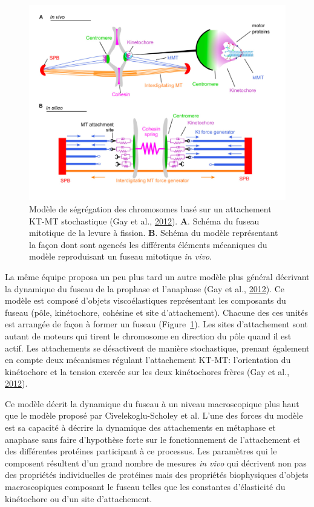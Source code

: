 \documentclass[12pt,a4paper,twoside,openright]{book}
\begin{document}
\begin{figure}[htbp]
\centering
\includegraphics{figures/intro/gay.png}
\caption[Modèle de ségrégation des chromosomes]{\label{fig:gay}Modèle de
ségrégation des chromosomes basé sur un attachement KT-MT stochastique
(Gay et al., \hyperref[ref-Gay2012a]{2012}). \textbf{A}. Schéma du
fuseau mitotique de la levure à fission. \textbf{B}. Schéma du modèle
représentant la façon dont sont agencés les différents éléments
mécaniques du modèle reproduisant un fuseau mitotique \emph{in vivo}.}
\end{figure}

La même équipe proposa un peu plus tard un autre modèle plus général
décrivant la dynamique du fuseau de la prophase et l'anaphase (Gay et
al., \hyperref[ref-Gay2012a]{2012}). Ce modèle est composé d'objets
viscoélastiques représentant les composants du fuseau (pôle,
kinétochore, cohésine et site d'attachement). Chacune des ces unités est
arrangée de façon à former un fuseau (Figure~\ref{fig:gay}). Les sites
d'attachement sont autant de moteurs qui tirent le chromosome en
direction du pôle quand il est actif. Les attachements se désactivent de
manière stochastique, prenant également en compte deux mécanismes
régulant l'attachement KT-MT: l'orientation du kinétochore et la tension
exercée sur les deux kinétochores frères (Gay et al.,
\hyperref[ref-Gay2012a]{2012}).

Ce modèle décrit la dynamique du fuseau à un niveau macroscopique plus
haut que le modèle proposé par Civelekoglu-Scholey et al. L'une des
forces du modèle est sa capacité à décrire la dynamique des attachements
en métaphase et anaphase sans faire d'hypothèse forte sur le
fonctionnement de l'attachement et des différentes protéines participant
à ce processus. Les paramètres qui le composent résultent d'un grand
nombre de mesures \emph{in vivo} qui décrivent non pas des propriétés
individuelles de protéines mais des propriétés biophysiques d'objets
macroscopiques composant le fuseau telles que les constantes
d'élasticité du kinétochore ou d'un site d'attachement.
\end{document}
